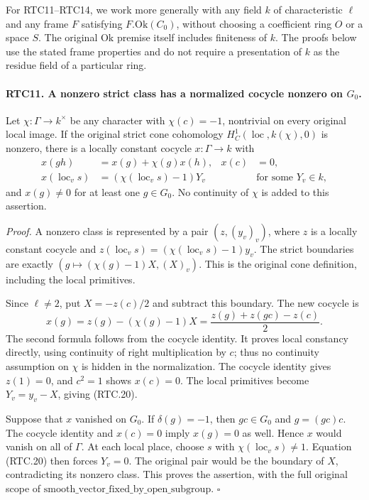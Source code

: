 \documentclass[11pt,a4paper]{article}
\numberwithin{equation}{section}
\theoremstyle{remark}\newtheorem{remark}[theorem]{Remark}
\begin{document}
For RTC11--RTC14, we work more generally with any field \(k\) of
characteristic \(\ell\) and any frame \(F\) satisfying
\(F.\mathrm{Ok}(C_0)\), without choosing a coefficient ring \(O\)
or a space \(S\).  The original \(\mathrm{Ok}\) premise itself
includes finiteness of \(k\).  The proofs below use the stated
frame properties and do not require a presentation of \(k\) as
the residue field of a particular ring.

\paragraph{RTC11. A nonzero strict class has a normalized cocycle nonzero on \(G_0\).}
\label{claim:RTC11}
Let \(\chi:\Gamma\to k^\times\) be any character with
\(\chi(c)=-1\), nontrivial on every original local image.
If the original strict cone cohomology
\(H^1_C(\operatorname{loc},k(\chi),0)\) is nonzero, there
is a locally constant cocycle \(x:\Gamma\to k\) with
\[
 \begin{aligned}
 x(gh)&=x(g)+\chi(g)x(h),& x(c)&=0,\\
 x(\operatorname{loc}_v s)&=(\chi(\operatorname{loc}_v s)-1)Y_v
       &&\text{for some }Y_v\in k,
 \end{aligned}                                             \tag{RTC.20}
\]
and \(x(g)\ne0\) for at least one \(g\in G_0\).
No continuity of \(\chi\) is added to this assertion.

\emph{Proof.}
A nonzero class is represented by a pair \((z,(y_v)_v)\),
where \(z\) is a locally constant cocycle and
\(z(\operatorname{loc}_v s)=(\chi(\operatorname{loc}_v s)-1)y_v\).
The strict boundaries are exactly
\((g\mapsto(\chi(g)-1)X,(X)_v)\).  This is the original
cone definition, including the local primitives.

Since \(\ell\ne2\), put \(X=-z(c)/2\) and subtract this
boundary.  The new cocycle is
\[
 x(g)=z(g)-(\chi(g)-1)X
      =\frac{z(g)+z(gc)-z(c)}2.
                                                        \tag{RTC.21}
\]
The second formula follows from the cocycle identity.  It proves
local constancy directly, using continuity of right multiplication
by \(c\); thus no continuity assumption on \(\chi\) is hidden
in the normalization.  The cocycle identity gives \(z(1)=0\),
and \(c^2=1\) shows \(x(c)=0\).  The local primitives become
\(Y_v=y_v-X\), giving (RTC.20).

Suppose that \(x\) vanished on \(G_0\).  If
\(\delta(g)=-1\), then \(gc\in G_0\) and
\(g=(gc)c\).  The cocycle identity and \(x(c)=0\) imply
\(x(g)=0\) as well.  Hence \(x\) would vanish on all of
\(\Gamma\).  At each local place, choose \(s\) with
\(\chi(\operatorname{loc}_v s)\ne1\).  Equation (RTC.20)
then forces \(Y_v=0\).  The original pair would be the
boundary of \(X\), contradicting its nonzero class.  This proves
the assertion, with the full original scope of
\(\mathrm{smooth\_\allowbreak vector\_\allowbreak fixed\_\allowbreak by\_\allowbreak open\_\allowbreak subgroup}\).
\hfill\(\square\)
\end{document}

